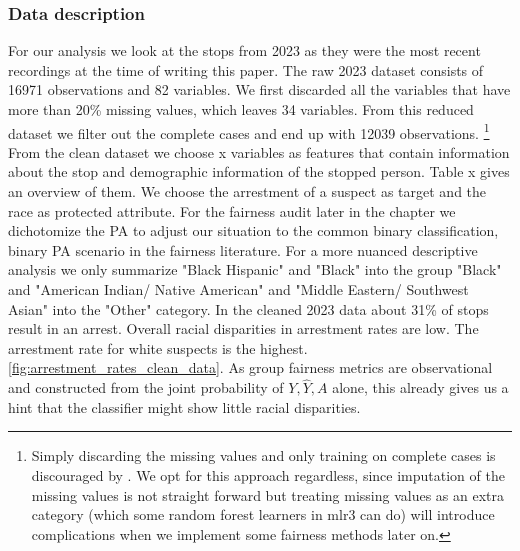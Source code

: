 \subsubsection*{Data description}
For our analysis we look at the stops from 2023 as they were the most recent recordings at the time of writing this paper. The raw 2023 dataset consists of 16971 observations and 82 variables. We first discarded all the variables that have more than 20\% missing values, which leaves 34 variables.
From this reduced dataset we filter out the complete cases and end up with 12039 observations. \footnote{Simply discarding the missing values and only training on complete cases is discouraged by \cite{fernando2021}. We opt for this approach regardless, since imputation of the missing values is not straight forward
but treating missing values as an extra category (which some random forest learners in mlr3 can do) will introduce complications when we implement some fairness methods later on.}
From the clean dataset we choose x variables as features that contain information about the stop and demographic information of the stopped person. Table x gives an overview of them. 
We choose the arrestment of a suspect as target and the race as protected attribute. For the fairness audit later in the chapter we dichotomize the PA to adjust our situation to the common binary classification, binary PA scenario in the fairness literature. For a more nuanced descriptive analysis we only summarize "Black Hispanic" and "Black" into the group "Black" and  "American Indian/ Native American" and "Middle Eastern/ Southwest Asian" into the "Other" category.  
In the cleaned 2023 data about 31\% of stops result in an arrest. Overall racial disparities in arrestment rates are low. The arrestment rate for white suspects is the highest. \autoref{fig:arrestment_rates_clean_data}. As group fairness metrics are observational and constructed from the joint probability of $Y, \hat{Y}, A$ alone, this already gives us a hint that the classifier might show little racial disparities.


